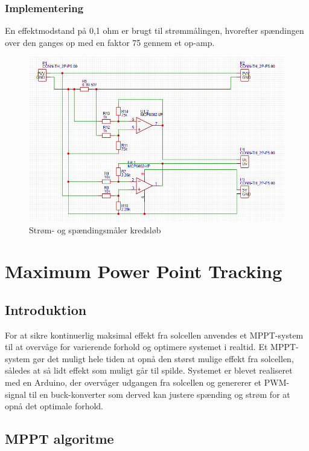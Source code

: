 \documentclass[../main.tex]{subfiles}
\begin{document}
        \subsubsection{Implementering}

        En effektmodstand på 0,1 ohm er brugt til strømmålingen, hvorefter spændingen over den ganges op med en faktor 75 gennem et op-amp.

        \begin{figure}[H]
        \includegraphics[width=\textwidth]{Dokumentation/målekredsløb.png}
        \caption{Strøm- og spændingsmåler kredsløb}
        \label{fig: Strøm- og spændingsmåler kredsløb}
        \end{figure}

\section{Maximum Power Point Tracking}
    \subsection{Introduktion}

    For at sikre kontinuerlig maksimal effekt fra solcellen anvendes et MPPT-system til at overvåge for varierende forhold og optimere systemet i realtid. Et MPPT-system gør det muligt hele tiden at opnå den størst mulige effekt fra solcellen, således at så lidt effekt som muligt går til spilde. Systemet er blevet realiseret med en Arduino, der overvåger udgangen fra solcellen og genererer et PWM-signal til en buck-konverter som derved kan justere spænding og strøm for at opnå det optimale forhold. 

    \subsection{MPPT algoritme}
\end{document}
